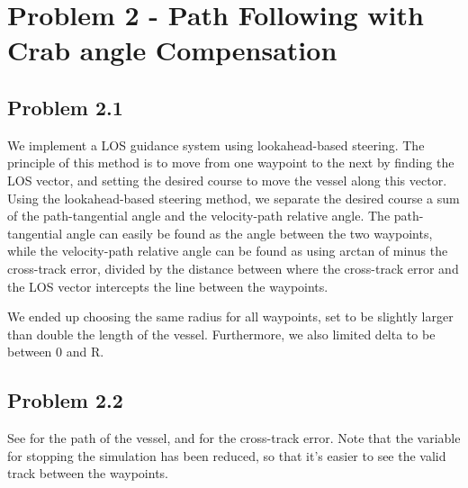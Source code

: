 \section*{Problem 2 - Path Following with Crab angle Compensation}
\subsection*{Problem 2.1}
We implement a LOS guidance system using lookahead-based steering. The principle of this method is to move from one waypoint to the next by finding the LOS vector, and setting the desired course to move the vessel along this vector. Using the lookahead-based steering method, we separate the desired course a sum of the path-tangential angle and the velocity-path relative angle. The path-tangential angle can easily be found as the angle between the two waypoints, while the velocity-path relative angle can be found as using arctan of minus the cross-track error, divided by the distance between where the cross-track error and the LOS vector intercepts the line between the waypoints. 

We ended up choosing the same radius for all waypoints, set to be slightly larger than double the length of the vessel. Furthermore, we also limited delta to be between 0 and R. 

\subsection*{Problem 2.2}
See  for the path of the vessel, and  for the cross-track error. Note that the variable for stopping the simulation has been reduced, so that it's easier to see the valid track between the waypoints. 

